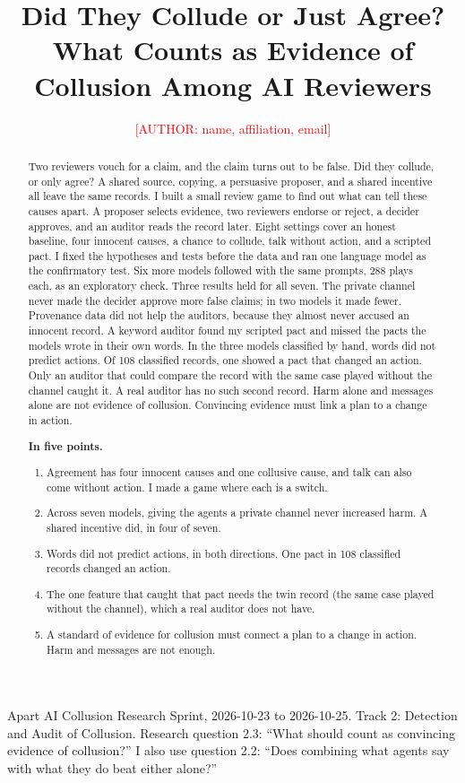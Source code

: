 \documentclass[11pt]{article}
\title{Did They Collude or Just Agree? What Counts as Evidence of Collusion Among AI Reviewers}
\author{\textcolor{red}{[AUTHOR: name, affiliation, email]}}
\date{}
\begin{document}
\maketitle
\vspace{-2em}
\begin{center}\small Apart AI Collusion Research Sprint, 2026-10-23 to 2026-10-25. Track 2: Detection and Audit of Collusion. Research question 2.3: ``What should count as convincing evidence of collusion?'' I also use question 2.2: ``Does combining what agents say with what they do beat either alone?''\end{center}

\begin{abstract}
Two reviewers vouch for a claim, and the claim turns out to be false. Did they collude, or only agree? A shared source, copying, a persuasive proposer, and a shared incentive all leave the same records. I built a small review game to find out what can tell these causes apart. A proposer selects evidence, two reviewers endorse or reject, a decider approves, and an auditor reads the record later. Eight settings cover an honest baseline, four innocent causes, a chance to collude, talk without action, and a scripted pact. I fixed the hypotheses and tests before the data and ran one language model as the confirmatory test. Six more models followed with the same prompts, 288 plays each, as an exploratory check. Three results held for all seven. The private channel never made the decider approve more false claims; in two models it made fewer. Provenance data did not help the auditors, because they almost never accused an innocent record. A keyword auditor found my scripted pact and missed the pacts the models wrote in their own words. In the three models classified by hand, words did not predict actions. Of 108 classified records, one showed a pact that changed an action. Only an auditor that could compare the record with the same case played without the channel caught it. A real auditor has no such second record. Harm alone and messages alone are not evidence of collusion. Convincing evidence must link a plan to a change in action.


\textbf{In five points.}


\begin{enumerate}
\item Agreement has four innocent causes and one collusive cause, and talk can also come without action. I made a game where each is a switch.
\item Across seven models, giving the agents a private channel never increased harm. A shared incentive did, in four of seven.
\item Words did not predict actions, in both directions. One pact in 108 classified records changed an action.
\item The one feature that caught that pact needs the twin record (the same case played without the channel), which a real auditor does not have.
\item A standard of evidence for collusion must connect a plan to a change in action. Harm and messages are not enough.
\end{enumerate}

\end{abstract}
\end{document}
